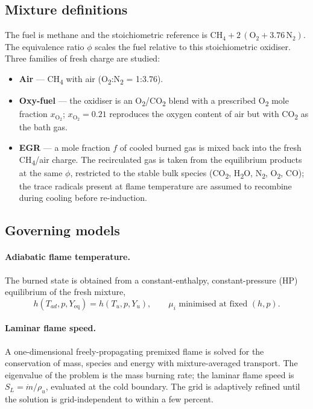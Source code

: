 \documentclass[11pt,a4paper]{article}
\begin{document}
\subsection{Mixture definitions}
The fuel is methane and the stoichiometric reference is
$\mathrm{CH_4 + 2\,(O_2 + 3.76\,N_2)}$. The equivalence ratio $\phi$ scales the
fuel relative to this stoichiometric oxidiser. Three families of fresh charge
are studied:
\begin{itemize}
  \item \textbf{Air} --- CH\textsubscript{4} with air
  (O\textsubscript{2}:N\textsubscript{2} = 1:3.76).
  \item \textbf{Oxy-fuel} --- the oxidiser is an
  O\textsubscript{2}/CO\textsubscript{2} blend with a prescribed
  O\textsubscript{2} mole fraction $x_{\mathrm{O_2}}$;
  $x_{\mathrm{O_2}} = 0.21$ reproduces the oxygen content of air but with
  CO\textsubscript{2} as the bath gas.
  \item \textbf{EGR} --- a mole fraction $f$ of cooled burned gas is mixed back
  into the fresh CH\textsubscript{4}/air charge. The recirculated gas is taken
  from the equilibrium products at the same $\phi$, restricted to the stable
  bulk species (CO\textsubscript{2}, H\textsubscript{2}O, N\textsubscript{2},
  O\textsubscript{2}, CO); the trace radicals present at flame temperature are
  assumed to recombine during cooling before re-induction.
\end{itemize}

\subsection{Governing models}
\paragraph{Adiabatic flame temperature.}
The burned state is obtained from a constant-enthalpy, constant-pressure (HP)
equilibrium of the fresh mixture,
\begin{equation}
  h(T_{ad}, p, Y_{\mathrm{eq}}) = h(T_u, p, Y_u), \qquad
  \mu_i \text{ minimised at fixed } (h,p).
\end{equation}

\paragraph{Laminar flame speed.}
A one-dimensional freely-propagating premixed flame is solved for the
conservation of mass, species and energy with mixture-averaged transport. The
eigenvalue of the problem is the mass burning rate; the laminar flame speed is
$S_L = \dot m / \rho_u$, evaluated at the cold boundary. The grid is adaptively
refined until the solution is grid-independent to within a few percent.
\end{document}

